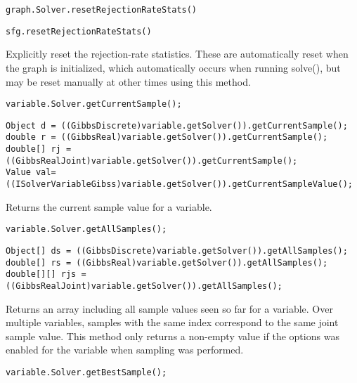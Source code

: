 \ifmatlab
\begin{lstlisting}
graph.Solver.resetRejectionRateStats()
\end{lstlisting}
\fi

\ifjava
\begin{lstlisting}
sfg.resetRejectionRateStats()
\end{lstlisting}
\fi

Explicitly reset the rejection-rate statistics.  These are automatically reset when the graph is initialized, which automatically occurs when running solve(), but may be reset manually at other times using this method.



\ifmatlab
\begin{lstlisting}
variable.Solver.getCurrentSample();
\end{lstlisting}
\fi

\ifjava
\begin{lstlisting}
Object d = ((GibbsDiscrete)variable.getSolver()).getCurrentSample();
double r = ((GibbsReal)variable.getSolver()).getCurrentSample();
double[] rj = ((GibbsRealJoint)variable.getSolver()).getCurrentSample();
Value val= ((ISolverVariableGibss)variable.getSolver()).getCurrentSampleValue();
\end{lstlisting}
\fi

Returns the current sample value for a variable.

\ifmatlab
\begin{lstlisting}
variable.Solver.getAllSamples();
\end{lstlisting}
\fi

\ifjava
\begin{lstlisting}
Object[] ds = ((GibbsDiscrete)variable.getSolver()).getAllSamples();
double[] rs = ((GibbsReal)variable.getSolver()).getAllSamples();
double[][] rjs = ((GibbsRealJoint)variable.getSolver()).getAllSamples();
\end{lstlisting}
\fi

Returns an array including all sample values seen so far for a variable. Over multiple variables, samples with the same index correspond to the same joint sample value. This method only returns a non-empty value if the  options was enabled for the variable when sampling was performed.

\ifmatlab
\begin{lstlisting}
variable.Solver.getBestSample();
\end{lstlisting}
\fi

